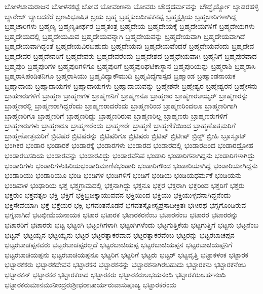 {ಬೋಳಚಾಮರಾಜನ
ಬೋಳನಕಟ್ಟೆ
ಬೋವ
ಬೋವಂಣನು
ಬೋವರು
ಬೌದ್ಧದರ್ಮವನ್ನು
ಬೌದ್ಧೈರ್ಯ್ಯೋ
ಬ್ಯಾಡರಹಳ್ಳಿ
ಬ್ಯಾರೇಜ್
ಬ್ಯಾಲದಕೆರೆ
ಬ್ರಣವಿಭೂಷಿತ
ಬ್ರಯ
ಬ್ರಹ್ಮ
ಬ್ರಹ್ಮಕುಲದೀಪಕನಪ್ಪ
ಬ್ರಹ್ಮಕ್ಷತ್ರಿಯ
ಬ್ರಹ್ಮಚಾರಿಗಳಾಗಿದ್ದ
ಬ್ರಹ್ಮಚಾರಿಗಳು
ಬ್ರಹ್ಮಣ್ಯ
ಬ್ರಹ್ಮಣ್ಯತೀರ್ಥರ
ಬ್ರಹ್ಮತಂತ್ರ
ಬ್ರಹ್ಮದೇಯ
ಬ್ರಹ್ಮದೇಯಕ್ಕೆ
ಬ್ರಹ್ಮದೇಯಗಳಿಗೆ
ಬ್ರಹ್ಮದೇಯಗಳು
ಬ್ರಹ್ಮದೇಯದಲ್ಲಿ
ಬ್ರಹ್ಮದೇಯಮಿವ
ಬ್ರಹ್ಮದೇಯವನ್ನಾಗಿ
ಬ್ರಹ್ಮದೇಯವನ್ನು
ಬ್ರಹ್ಮದೇಯವಾಗಿ
ಬ್ರಹ್ಮದೇಯವಾಗಿದೆ
ಬ್ರಹ್ಮದೇಯವಾಗಿದ್ದಂತೆ
ಬ್ರಹ್ಮದೇಯವಿರಬಹುದು
ಬ್ರಹ್ಮದೇಯವು
ಬ್ರಹ್ಮದೇಯವೆಂದರೆ
ಬ್ರಹ್ಮದೇಯವೆಂದು
ಬ್ರಹ್ಮದೇವ
ಬ್ರಹ್ಮದೇವರ
ಬ್ರಹ್ಮದೇವರಿಗೆ
ಬ್ರಹ್ಮದೇವರು
ಬ್ರಹ್ಮದೇವರೆಂದು
ಬ್ರಹ್ಮದೇಶದ
ಬ್ರಹ್ಮಧೇಯವಾಗಿ
ಬ್ರಹ್ಮನಿಗೆ
ಬ್ರಹ್ಮಪುರವಾದ
ಬ್ರಹ್ಮಪುರಿ
ಬ್ರಹ್ಮಪುರಿಗಳ
ಬ್ರಹ್ಮಪುರಿಗಳಿಗೂ
ಬ್ರಹ್ಮಪುರಿಗೆ
ಬ್ರಹ್ಮಪುರಿಘಟಿಕಾಸ್ಥಾನ
ಬ್ರಹ್ಮಪುರಿಯನ್ನು
ಬ್ರಹ್ಮರಾಶಿ
ಬ್ರಹ್ಮರಾಸಿ
ಬ್ರಹ್ಮರಾಸಿಪಂಡಿತನಿಗೂ
ಬ್ರಹ್ಮರಾಸಿಯು
ಬ್ರಹ್ಮವಿದ್ಯಾಕೌಮುದಿ
ಬ್ರಹ್ಮವಿದ್ಯೆಗಾಸ್ಪದ
ಬ್ರಹ್ಮಾಂಡ
ಬ್ರಹ್ಮಾಂಡನಾಯಕ
ಬ್ರಹ್ಮಾದಾಯ
ಬ್ರಹ್ಮಾದಾಯಗಳ
ಬ್ರಹ್ಮಾದಾಯಗಳು
ಬ್ರಹ್ಮಾದಾಯವನ್ನು
ಬ್ರಹ್ಮೇಶನೇ
ಬ್ರಹ್ಮೇಶ್ವರ
ಬ್ರಹ್ಮೇಶ್ವರನ
ಬ್ರಹ್ಮೇಸನು
ಬ್ರಾಹಣರುಗಳಿಗೆ
ಬ್ರಾಹ್ಮಣ
ಬ್ರಾಹ್ಮಣಗಳ
ಬ್ರಾಹ್ಮಣನಿಗೆ
ಬ್ರಾಹ್ಮಣನೂ
ಬ್ರಾಹ್ಮಣರ
ಬ್ರಾಹ್ಮಣರಅಯ್ಯರ್
ಬ್ರಾಹ್ಮಣರನ್ನು
ಬ್ರಾಹ್ಮಣರಲ್ಲಿ
ಬ್ರಾಹ್ಮಣರಾಗಿದ್ದರೆಂದು
ಬ್ರಾಹ್ಮಣರಾದರೆಂದು
ಬ್ರಾಹ್ಮಣರಿಂದ
ಬ್ರಾಹ್ಮಣರಿಂದಲೂ
ಬ್ರಾಹ್ಮಣರಿಗಾಗಿ
ಬ್ರಾಹ್ಮಣರಿಗೂ
ಬ್ರಾಹ್ಮಣರಿಗೆ
ಬ್ರಾಹ್ಮಣರಿದ್ದು
ಬ್ರಾಹ್ಮಣರಿರುವ
ಬ್ರಾಹ್ಮಣರಿಲ್ಲ
ಬ್ರಾಹ್ಮಣರು
ಬ್ರಾಹ್ಮಣರುಗಳಿಗೆ
ಬ್ರಾಹ್ಮಣರುಗಳು
ಬ್ರಾಹ್ಮಣರೂ
ಬ್ರಾಹ್ಮಣರೆಂದು
ಬ್ರಾಹ್ಮಣರೇ
ಬ್ರಾಹ್ಮಣಿ
ಬ್ರಾಹ್ಮಣಿಕೆಯಿಂದ
ಬ್ರಾಹ್ಮಣೊತ್ತಮರಿಗೆ
ಬ್ರಾಹ್ಮಣೋತ್ತಮರಿಗೆ
ಬ್ರಿಟಿಷರ
ಬ್ರಿಟಿಷರನ್ನು
ಬ್ರಿಟಿಷರಿಗೂ
ಬ್ರಿಟಿಷರು
ಬ್ರಿಟಿಷ್
ಬ್ರಿಟೀಷ್
ಬ್ರಿಡ್ಜ್
ಬ್ರೀಹಿ
ಬ್ರೂಸ್ಫೂಟ್
ಭಂಗಿಕರ
ಭಂಡಾರ
ಭಂಡಾರಕೆ
ಭಂಡಾರಕ್ಕೆ
ಭಂಡಾರಗಳು
ಭಂಡಾರದ
ಭಂಡಾರದಲ್ಲಿ
ಭಂಡಾರದಿಂದ
ಭಂಡಾರದ್ರೋಹ
ಭಂಡಾರಬಸದಿಯ
ಭಂಡಾರವನ್ನು
ಭಂಡಾರವಿದ್ದು
ಭಂಡಾರವೆನಿಪ
ಭಂಡಾರಿ
ಭಂಡಾರಿಗನಾಗಿದ್ದನು
ಭಂಡಾರಿಗಳಾಗಿದ್ದು
ಭಂಡಾರಿಗಳು
ಭಂಡಾರಿಗಳುಹಿರಿಯಭಂಡಾರಿಮಾಣಿಕಭಂಡಾರಿ
ಭಂಡಾರಿಗೌಂಡ
ಭಂಡಾರಿಯಾಗಿದ್ದ
ಭಂಡಾರಿಯಾಗಿದ್ದನು
ಭಂಡಾರಿಯು
ಭಂಡಾರಿಯೂ
ಭಂಡಿ
ಭಂಡಿಗಳ
ಭಂಡಿಗಳಿಗೆ
ಭಂಡಿಗೆ
ಭಂಡಿಯ
ಭಂಡಿಯಧರ್ಮಕೆ
ಭಂಡಿಯನು
ಭಂಡಿವಾಳ
ಭಂಢಾರಿಯ
ಭಕ್ತ
ಭಕ್ತಗ್ರಾಮದಲ್ಲಿ
ಭಕ್ತನಾಗಿದ್ದು
ಭಕ್ತನೂ
ಭಕ್ತರ
ಭಕ್ತರಾಗಿ
ಭಕ್ತರಿಂದ
ಭಕ್ತರಿಗೆ
ಭಕ್ತರು
ಭಕ್ತರುಂ
ಭಕ್ತವತ್ಸಲ
ಭಕ್ತಿ
ಭಕ್ತಿಗೆ
ಭಕ್ತಿಬ್ರಜಕ್ಕಾಯುವವನ
ಭಕ್ತಿಯಿಂದ
ಭಕ್ತಿಯು
ಭಕ್ತಿಯುಳ್ಳವನಾಗಿದ್ದನೆಂದು
ಭಕ್ತಿಸೇವೆಯಾಗಿ
ಭಕ್ತೆ
ಭಕ್ತೆಯರ
ಭಕ್ಷಿ
ಭಗವಂತನೊಡನೆ
ಭಗವತಸ್ಸೋಸ್ಯಪ್ರಸಾದೀಕ್ರಿತಃ
ಭಗೀರಥ
ಭಗ್ನಗೊಂಡಿರುವ
ಭಗ್ನವಾಗಿದೆ
ಭಟಭೀಮೆಯನಾಯಕ
ಭಟಾರ
ಭಟಾರಕ
ಭಟಾರಕರನೆಂಬ
ಭಟಾರನೆಂಬ
ಭಟಾರರ
ಭಟಾರರನ್ನು
ಭಟಾರರಿಗೆ
ಭಟಾರರು
ಭಟ್ಟ
ಭಟ್ಟಂಗಿ
ಭಟ್ಟಂಗಿಗಳಾಗಿ
ಭಟ್ಟಂಗಿಗಳೆಂದು
ಭಟ್ಟಗುತ್ತಿಕೆಯ
ಭಟ್ಟಗುತ್ತಿಗೆ
ಭಟ್ಟನು
ಭಟ್ಟನೆಂಬ
ಭಟ್ಟನ್
ಭಟ್ಟಯ್ಯನ
ಭಟ್ಟಯ್ಯನು
ಭಟ್ಟರ
ಭಟ್ಟರತ್ನಾಕರವಾದ
ಭಟ್ಟರತ್ನಾಕರವೆಂಬ
ಭಟ್ಟರನ್ನು
ಭಟ್ಟರಬಾಚಪ್ಪನ
ಭಟ್ಟರಬಾಚಪ್ಪನವರು
ಭಟ್ಟರಬಾಚಪ್ಪರಲ್ಲದೆ
ಭಟ್ಟರಬಾಚಿಯಪ್ಪ
ಭಟ್ಟರಬಾಚಿಯಪ್ಪನ
ಭಟ್ಟರಬಾಚಿಯಪ್ಪನಿಗೆ
ಭಟ್ಟರಬಾಚಿಯಪ್ಪನು
ಭಟ್ಟರಬಾಚಿಯಪ್ಪನೂ
ಭಟ್ಟರಿಗ
ಭಟ್ಟರಿಗೆ
ಭಟ್ಟರು
ಭಟ್ಟರ್
ಭಟ್ಟವೃತ್ತಿ
ಭಟ್ಟಾಕಳಂಕ
ಭಟ್ಟಾರಕ
ಭಟ್ಟಾರಕಕರು
ಭಟ್ಟಾರಕದೇವನ
ಭಟ್ಟಾರಕನ
ಭಟ್ಟಾರಕನನ್ನು
ಭಟ್ಟಾರಕನಾಗಿರಬಹುದು
ಭಟ್ಟಾರಕನು
ಭಟ್ಟಾರಕನೆಂಬ
ಭಟ್ಟಾರಕನ್
ಭಟ್ಟಾರಕರ
ಭಟ್ಟಾರಕರಾದ
ಭಟ್ಟಾರಕರು
ಭಟ್ಟಾರಕರುಅಭಯನಂದಿ
ಭಟ್ಟಾರಕರುಅರ್ಹನಂದಿ
ಭಟ್ಟಾರಕರುಮಾನಮುನೀಂದ್ರರುಶ್ರೀಧರಾಚಾರ್ಯರುವಾಸುಪೂಜ್ಯ
ಭಟ್ಟಾರಕರೆಂದು
}
